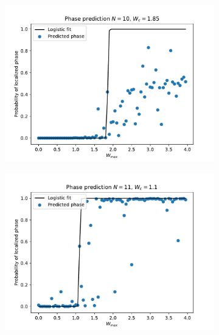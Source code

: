 \documentclass[reprint,amsmath,amssymb,aps,prb]{revtex4-2}
\begin{document}
\newpage
\begin{figure}[H]
	\begin{subfigure}[c]{0.3\textwidth}
		\includegraphics[width=\textwidth]{../results/N10_predict_wc}
		\label{fig:N10_predict_wc}
	\end{subfigure}
	\begin{subfigure}[c]{0.3\textwidth}
		\includegraphics[width=\textwidth]{../results/N11_predict_wc}
		\label{fig:N11_predict_wc}
	\end{subfigure}
	\begin{subfigure}[c]{0.3\textwidth}

\end{subfigure}
\end{figure}
\end{document}
